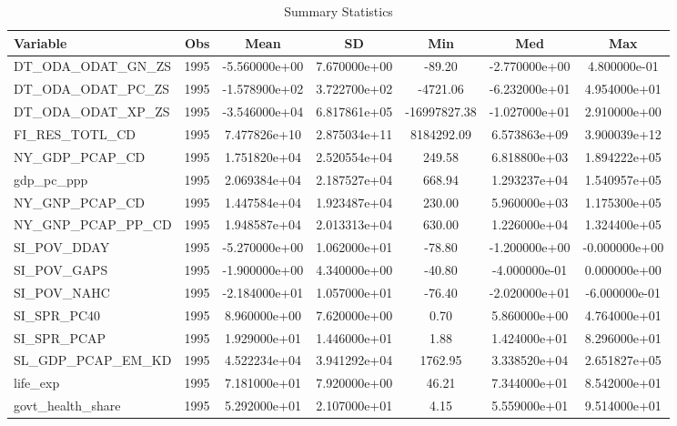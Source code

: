\begin{table}
\centering
\caption{Summary Statistics}
\label{Sum_Stats}
\begin{tabular}{lcccccc}
\toprule
         Variable &  Obs &          Mean &           SD &          Min &           Med &           Max \\
\midrule
DT\_ODA\_ODAT\_GN\_ZS & 1995 & -5.560000e+00 & 7.670000e+00 & -89.20 & -2.770000e+00 & 4.800000e-01 \\
DT\_ODA\_ODAT\_PC\_ZS & 1995 & -1.578900e+02 & 3.722700e+02 & -4721.06 & -6.232000e+01 & 4.954000e+01 \\
DT\_ODA\_ODAT\_XP\_ZS & 1995 & -3.546000e+04 & 6.817861e+05 & -16997827.38 & -1.027000e+01 & 2.910000e+00 \\
FI\_RES\_TOTL\_CD & 1995 & 7.477826e+10 & 2.875034e+11 & 8184292.09 & 6.573863e+09 & 3.900039e+12 \\
NY\_GDP\_PCAP\_CD & 1995 & 1.751820e+04 & 2.520554e+04 & 249.58 & 6.818800e+03 & 1.894222e+05 \\
gdp\_pc\_ppp & 1995 & 2.069384e+04 & 2.187527e+04 & 668.94 & 1.293237e+04 & 1.540957e+05 \\
NY\_GNP\_PCAP\_CD & 1995 & 1.447584e+04 & 1.923487e+04 & 230.00 & 5.960000e+03 & 1.175300e+05 \\
NY\_GNP\_PCAP\_PP\_CD & 1995 & 1.948587e+04 & 2.013313e+04 & 630.00 & 1.226000e+04 & 1.324400e+05 \\
SI\_POV\_DDAY & 1995 & -5.270000e+00 & 1.062000e+01 & -78.80 & -1.200000e+00 & -0.000000e+00 \\
SI\_POV\_GAPS & 1995 & -1.900000e+00 & 4.340000e+00 & -40.80 & -4.000000e-01 & 0.000000e+00 \\
SI\_POV\_NAHC & 1995 & -2.184000e+01 & 1.057000e+01 & -76.40 & -2.020000e+01 & -6.000000e-01 \\
SI\_SPR\_PC40 & 1995 & 8.960000e+00 & 7.620000e+00 & 0.70 & 5.860000e+00 & 4.764000e+01 \\
SI\_SPR\_PCAP & 1995 & 1.929000e+01 & 1.446000e+01 & 1.88 & 1.424000e+01 & 8.296000e+01 \\
SL\_GDP\_PCAP\_EM\_KD & 1995 & 4.522234e+04 & 3.941292e+04 & 1762.95 & 3.338520e+04 & 2.651827e+05 \\
life\_exp & 1995 & 7.181000e+01 & 7.920000e+00 & 46.21 & 7.344000e+01 & 8.542000e+01 \\
govt\_health\_share & 1995 & 5.292000e+01 & 2.107000e+01 & 4.15 & 5.559000e+01 & 9.514000e+01 \\
\bottomrule
\end{tabular}
\end{table}
